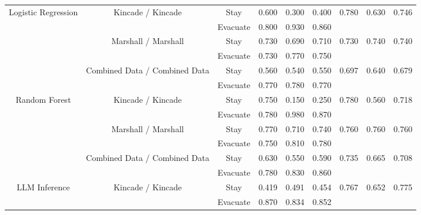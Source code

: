 \begin{table*}[t]
{\begin{tabular}{c|c|c|ccc|ccc}
\midrule
\midrule
\multirow{6}{*}{Logistic Regression} 
& \multirow{2}{*}{Kincade / Kincade} 
  & Stay     & 0.600 & 0.300 & 0.400 & \multirow{2}{*}{0.780} & \multirow{2}{*}{0.630} & \multirow{2}{*}{0.746} \\
&           & Evacuate & 0.800 & 0.930 & 0.860 &                     &                     &                     \\ 
\cmidrule{2-9}
& \multirow{2}{*}{Marshall / Marshall} 
  & Stay     & 0.730 & 0.690 & 0.710 & \multirow{2}{*}{0.730} & \multirow{2}{*}{0.740} & \multirow{2}{*}{0.740} \\
&           & Evacuate & 0.730 & 0.770 & 0.750 &                     &                     &                     \\ 
\cmidrule{2-9}
& \multirow{2}{*}{Combined Data / Combined Data} 
  & Stay     & 0.560 & 0.540 & 0.550 & \multirow{2}{*}{0.697} & \multirow{2}{*}{0.640} & \multirow{2}{*}{0.679} \\
&           & Evacuate & 0.770 & 0.780 & 0.770 &                     &                     &                     \\ 
\midrule
\multirow{6}{*}{Random Forest} 
& \multirow{2}{*}{Kincade / Kincade} 
  & Stay     & 0.750 & 0.150 & 0.250 & \multirow{2}{*}{0.780} & \multirow{2}{*}{0.560} & \multirow{2}{*}{0.718} \\
&           & Evacuate & 0.780 & 0.980 & 0.870 &                     &                     &                     \\ 
\cmidrule{2-9}
& \multirow{2}{*}{Marshall / Marshall} 
  & Stay     & 0.770 & 0.710 & 0.740 & \multirow{2}{*}{0.760} & \multirow{2}{*}{0.760} & \multirow{2}{*}{0.760} \\
&           & Evacuate & 0.750 & 0.810 & 0.780 &                     &                     &                     \\ 
\cmidrule{2-9}
& \multirow{2}{*}{Combined Data / Combined Data} 
  & Stay     & 0.630 & 0.550 & 0.590 & \multirow{2}{*}{0.735} & \multirow{2}{*}{0.665} & \multirow{2}{*}{0.708} \\
&           & Evacuate & 0.780 & 0.830 & 0.860 &                     &                     &                     \\ 
\midrule
\multirow{6}{*}{LLM Inference} 
& \multirow{2}{*}{Kincade / Kincade} 
  & Stay     & 0.419 & 0.491 & 0.454 & \multirow{2}{*}{0.767} & \multirow{2}{*}{0.652} & \multirow{2}{*}{0.775} \\
&           & Evacuate & 0.870 & 0.834 & 0.852 &                     &                     &                     \\ 

\end{tabular}}
\end{table*}
